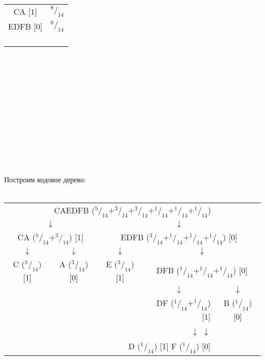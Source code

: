 \\
\begin{minipage}[h]{6cm}
\begin{tabular}{|c|c|}
\hline
CA [1] & $^8/_{14}$ \\
EDFB [0] & $^6/_{14}$ \\
& \\
& \\
& \\
& \\
\hline
\end{tabular}
\end{minipage}
\\\\\\\\\\\\\\\\\\\\\\
\\Построим кодовое дерево:\\
\\
\begin{minipage}[!h]{\textwidth}
\centering
\begin{tabular}{c c c c c c}
\multicolumn{6}{c}{CAEDFB ($^5/_{14} + ^3/_{14} + ^3/_{14} + ^1/_{14} + ^1/_{14} + ^1/_{14}$)} \\
\multicolumn{2}{c}{$\downarrow$} & \multicolumn{4}{c}{$\downarrow$} \\
\multicolumn{2}{c}{CA ($^5/_{14} + ^3/_{14}$) [1]} & \multicolumn{4}{c}{EDFB ($^3/_{14} + ^1/_{14} + ^1/_{14} + ^1/_{14}$) [0]} \\
$\downarrow$ & $\downarrow$ & \qquad $\downarrow$ & \multicolumn{3}{c}{$\downarrow$} \\
C ($^5/_{14}$) [1] & A ($^3/_{14}$) [0] & E ($^3/_{14}$) [1] & \multicolumn{3}{c}{DFB ($^1/_{14} + ^1/_{14} + ^1/_{14}$) [0]} \\
& & & \multicolumn{2}{c}{$\downarrow$} & $\downarrow$ \\
& & & \multicolumn{2}{r}{DF ($^1/_{14} + ^1/_{14}$) [1]} & B ($^1/_{14}$) [0] \\
\multicolumn{5}{r}{$\downarrow$ \qquad \qquad $\downarrow$ \qquad \qquad} & \\
\multicolumn{5}{r}{D ($^1/_{14}$) [1] \qquad  F ($^1/_{14}$) [0]} & \\
\end{tabular}
\end{minipage}
